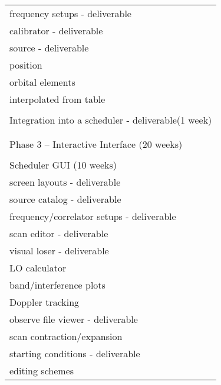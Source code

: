\begin{longtable}{l}
   \hspace{0.25in}frequency setups - deliverable\\
   \hspace{0.25in}calibrator - deliverable\\
   \hspace{0.25in}source - deliverable\\
   \hspace{0.5in}  position\\
   \hspace{0.5in}  orbital elements\\
   \hspace{0.5in}  interpolated from table\\
   \\
Integration into a scheduler - deliverable(1 week)\\
\\
\\
Phase 3 -- Interactive Interface (20 weeks)\\
\hline\\
Scheduler GUI (10 weeks)\\
   \hspace{0.25in}screen layouts - deliverable\\
   \hspace{0.25in}source catalog - deliverable\\
   \hspace{0.25in}frequency/correlator setups - deliverable\\
   \hspace{0.25in}scan editor - deliverable\\
   \hspace{0.25in}visual loser - deliverable\\
   \hspace{0.5in}   LO calculator\\
   \hspace{0.5in}   band/interference plots\\
   \hspace{0.5in}   Doppler tracking\\
   \hspace{0.25in}observe file viewer - deliverable\\
   \hspace{0.25in}scan contraction/expansion\\
   \hspace{0.25in}starting conditions - deliverable\\
   \hspace{0.25in}editing schemes\\

\end{longtable}
